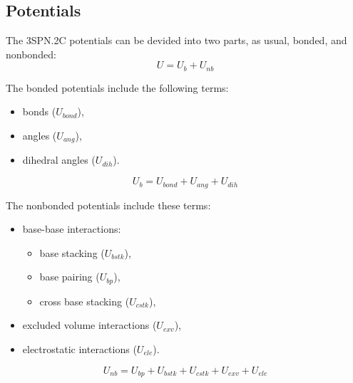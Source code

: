 \subsection{Potentials}
\label{subsec:dna_3spn2c_potential}

The 3SPN.2C potentials can be devided into two parts, as usual, bonded, and
nonbonded:
\begin{displaymath}
  U = U_b + U_{nb}
\end{displaymath}

The bonded potentials include the following terms:
\begin{itemize}
\item bonds ($U_{bond}$),
\item angles ($U_{ang}$),
\item dihedral angles ($U_{dih}$).
\end{itemize}
\begin{equation}
  \label{eq:dna_3spn2c_local}
  U_b = U_{bond} + U_{ang} + U_{dih}
\end{equation}

The nonbonded potentials include these terms:
\begin{itemize}
\item base-base interactions:
  \begin{itemize}
  \item base stacking ($U_{bstk}$),
  \item base pairing ($U_{bp}$),
  \item cross base stacking ($U_{cstk}$),
  \end{itemize}
\item excluded volume interactions ($U_{exv}$),
\item electrostatic interactions ($U_{ele}$).
\end{itemize}
\begin{equation}
  \label{eq:dna_3spn2c_nonlocal}
  U_{nb} = U_{bp} + U_{bstk} + U_{cstk} + U_{exv} + U_{ele}
\end{equation}


